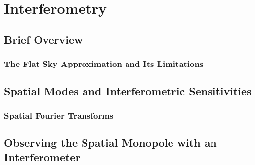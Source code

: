 \chapter{Interferometry}

\section{Brief Overview}

\subsection{The Flat Sky Approximation and Its Limitations}

\section{Spatial Modes and Interferometric Sensitivities}

\subsection{Spatial Fourier Transforms}

\section{Observing the Spatial Monopole with an Interferometer}

